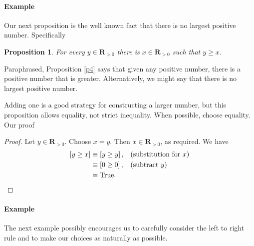 \documentclass[12pt,fleqn]{article}
\newcommand{\reals}{\mathbf{R}}
\newcommand{\true}{\mathrm{True}}
\newenvironment{myproof}
  {\begin{shaded}\begin{proof}}
  {\end{proof}\end{shaded}}
\newtheorem{prop}{Proposition}
\newcounter{ex}\setcounter{ex}{0}
\newcommand{\ex}{%
\setcounter{ex}{\value{ex}+1}
\paragraph{Example \theex}}
\begin{document}
\ex Our next proposition is the well known fact that there is
no largest positive number. Specifically
       \begin{prop} For every $y \in \reals_{> 0}$ there is  
        $x \in \reals_{>0}$ such that $y \geq  x$. \label{p6}
      \end{prop}
      Paraphrased, Proposition \ref{p4} says that given any positive number, there is a positive number that is greater. Alternatively, we
      might say that there is no largest positive number. 
      
      Adding one is a good strategy for constructing a larger number, but this proposition
      allows equality, not strict inequality.  When possible, choose equality. Our proof
      
       \begin{myproof} Let $y \in \reals_{>0}$. Choose $x = y$. Then $x \in \reals_{>0}$, as 
        required. We have
       \begin{align*}
         \left[y \geq x  \right] &\equiv \left[y \geq  y \right], && \text{(substitution for $x$)} \\
                                      &\equiv \left[0 \geq 0 \right], &&\text{(subtract $y$)} \\
                                      &\equiv \true. && \qedhere
       \end{align*}
       
       \end{myproof}

   


       \ex The next example possibly encourages us to carefully 
       consider the left to right rule and to make our choices 
       as naturally as possible.
\end{document}
